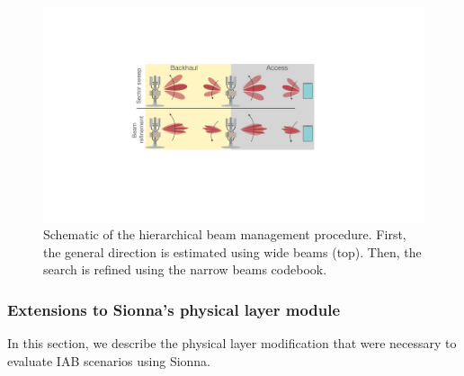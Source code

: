 \begin{figure}[t!]
    \centering
    \includegraphics[scale=0.28]{Figures/Safehaul/Beamforming-2.pdf}
      \caption{Schematic of the hierarchical beam management procedure. First, the general direction is estimated using wide beams (top). Then, the search is refined using the narrow beams codebook.}
      \label{fig:beamforming}
      \vspace{-5mm}
\end{figure}



\subsubsection*{Extensions to Sionna's physical layer module}
\label{sub:additionalSionna}
In this section, we describe the physical layer modification that were necessary to evaluate IAB scenarios using Sionna. 


